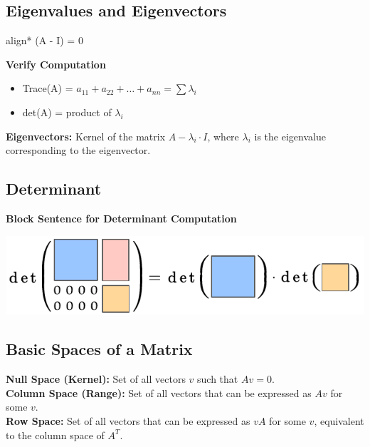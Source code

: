 \documentclass[8pt, a4paper, landscape, includeheadfoot]{extarticle}
\begin{document}
\begin{multicols*}{4}
	\subsection{Eigenvalues and Eigenvectors}

	\begin{empheq}[box = \mathboxnoback]{align*}
		 \det(A - \lambda\cdot I) = 0
	\end{empheq}

	\textbf{Verify Computation}

	\begin{itemize}[leftmargin=0.29cm, itemsep=0.5pt]
		\item Trace(A) = \( a_{11} + a_{22} + \dots + a_{nn} = \sum \lambda_i \)
		\item det(A) = product of \( \lambda_i \)
	\end{itemize}

	\textbf{Eigenvectors: } Kernel of the matrix $A - \lambda_i\cdot I$, where \( \lambda_i \) is the eigenvalue corresponding to the eigenvector.

	\subsection{Determinant}

	\textbf{Block Sentence for Determinant Computation}

	\begin{center}
		\includegraphics[width = 0.8 \columnwidth]{0_images/Blocksatz.pdf}
	\end{center}

	\subsection{Basic Spaces of a Matrix}

	\textbf{Null Space (Kernel):} Set of all vectors \( v \) such that \( A v = 0 \).\\
	\textbf{Column Space (Range):} Set of all vectors that can be expressed as \( A v \) for some \( v \).\\
	\textbf{Row Space:} Set of all vectors that can be expressed as \( v A \) for some \( v \), equivalent to the column space of \( A^T \).\\


\end{multicols*}
\end{document}
